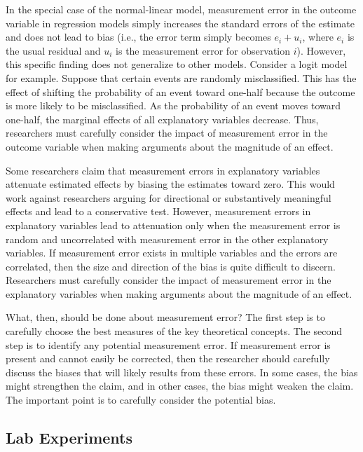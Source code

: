 \documentclass[12pt]{article}
\begin{document}
\begin{appendix}
In the special case of the normal-linear model, measurement error in the outcome variable in regression models simply increases the standard errors of the estimate and does not lead to bias (i.e., the error term simply becomes $e_i + u_i$, where $e_i$ is the usual residual and $u_i$ is the measurement error for observation $i$). However, this specific finding does not generalize to other models. Consider a logit model for example. Suppose that certain events are randomly misclassified. This has the effect of shifting the probability of an event toward one-half because the outcome is more likely to be misclassified. As the probability of an event moves toward one-half, the marginal effects of all explanatory variables decrease. Thus, researchers must carefully consider the impact of measurement error in the outcome variable when making arguments about the magnitude of an effect.  


Some researchers claim that measurement errors in explanatory variables attenuate estimated effects by biasing the estimates toward zero. This would work against researchers arguing for directional or substantively meaningful effects and lead to a conservative test. However, measurement errors in explanatory variables lead to attenuation only when the measurement error is random and uncorrelated with measurement error in the other explanatory variables. If measurement error exists in multiple variables and the errors are correlated, then the size and direction of the bias is quite difficult to discern. Researchers must carefully consider the impact of measurement error in the explanatory variables when making arguments about the magnitude of an effect.


What, then, should be done about measurement error? The first step is to carefully choose the best measures of the key theoretical concepts. The second step is to identify any potential measurement error. If measurement error is present and cannot easily be corrected, then the researcher should carefully discuss the biases that will likely results from these errors. In some cases, the bias might strengthen the claim, and in other cases, the bias might weaken the claim. The important point is to carefully consider the potential bias.

\subsection*{Lab Experiments}


\end{appendix}
\end{document}
